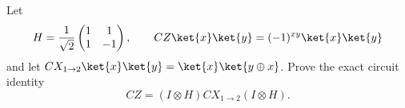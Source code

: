 Let
$$
    H=\frac1{\sqrt2}\begin{pmatrix}1&1\\1&-1\end{pmatrix},
    \qquad
    CZ\ket{x}\ket{y}=(-1)^{xy}\ket{x}\ket{y}
$$
and let $CX_{1\to2}\ket{x}\ket{y}=\ket{x}\ket{y\oplus x}$.  Prove the exact circuit identity
$$
    CZ=(I\otimes H)CX_{1\to2}(I\otimes H).
$$
